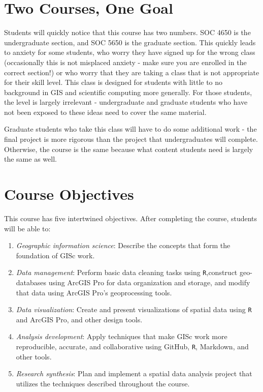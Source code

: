 \documentclass[
]{book}
\begin{document}
\hypertarget{two-courses-one-goal}{%
\section{Two Courses, One Goal}\label{two-courses-one-goal}}

Students will quickly notice that this course has two numbers. SOC 4650 is the undergraduate section, and SOC 5650 is the graduate section. This quickly leads to anxiety for some students, who worry they have signed up for the wrong class (occasionally this is not misplaced anxiety - make sure you are enrolled in the correct section!) or who worry that they are taking a class that is not appropriate for their skill level. This class is designed for students with little to no background in GIS and scientific computing more generally. For those students, the level is largely irrelevant - undergraduate and graduate students who have not been exposed to these ideas need to cover the same material.

Graduate students who take this class will have to do some additional work - the final project is more rigorous than the project that undergraduates will complete. Otherwise, the course is the same because what content students need is largely the same as well.

\hypertarget{course-objectives}{%
\section{Course Objectives}\label{course-objectives}}

This course has five intertwined objectives. After completing the course, students will be able to:

\begin{enumerate}
\def\labelenumi{\arabic{enumi}.}
\item
  \emph{Geographic information science}: Describe the concepts that form the foundation of GISc work.
\item
  \emph{Data management}: Perform basic data cleaning tasks using \texttt{R},construct geo-databases using ArcGIS Pro for data organization and storage, and modify that data using ArcGIS Pro's geoprocessing tools.
\item
  \emph{Data visualization}: Create and present visualizations of spatial data using \texttt{R} and ArcGIS Pro, and other design tools.
\item
  \emph{Analysis development}: Apply techniques that make GISc work more reproducible, accurate, and collaborative using GitHub, \texttt{R}, Markdown, and other tools.
\item
  \emph{Research synthesis}: Plan and implement a spatial data analysis project that utilizes the techniques described throughout the course.
\end{enumerate}
\end{document}
